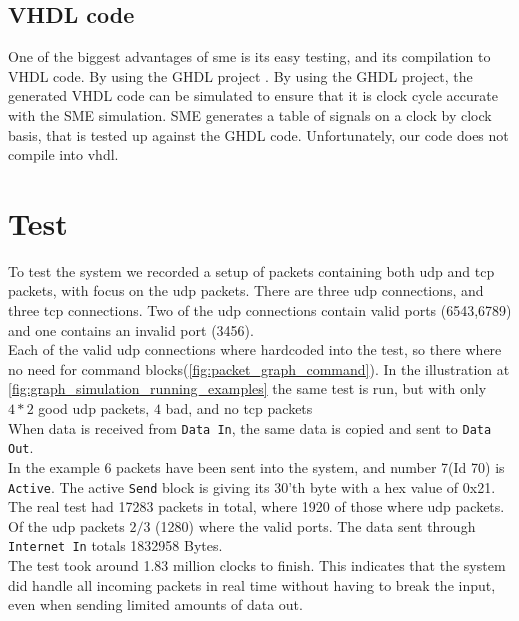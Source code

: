 \subsection{VHDL code}
One of the biggest advantages of \gls{sme} is its easy testing, and its
compilation to VHDL code. By using the GHDL project
\cite{github_ghdl}.
By using the GHDL project, the generated VHDL code can be simulated to ensure
that it is clock cycle accurate with the SME simulation. SME generates a table
of signals on a clock by clock basis, that is tested up against the GHDL code.
Unfortunately, our code does not compile into \gls{vhdl}.


\section{Test}
To test the system we recorded a setup of packets containing both \gls{udp} and
\gls{tcp} packets, with focus on the \gls{udp} packets. There are three
\gls{udp} connections, and three \gls{tcp} connections. Two of the \gls{udp}
connections contain valid ports (6543,6789) and one contains an invalid port (3456).\\
Each of the valid \gls{udp} connections where hardcoded into the test, so there where no
need for command blocks(\autoref{fig:packet_graph_command}).
In the illustration at \autoref{fig:graph_simulation_running_examples} the
same test is run, but with only $4*2$ good \gls{udp} packets, $4$ bad, and
no \gls{tcp} packets\\
When data is received from \texttt{Data In}, the same data is copied and
sent to \texttt{Data Out}. \\
In the example 6 packets have been sent into the system, and number 7(Id 70)
is \texttt{Active}. The active \texttt{Send} block is giving its 30'th byte
with a hex value of 0x21.\\
The real test had 17283 packets in total, where 1920 of those where udp packets.
Of the udp packets $2/3$ (1280) where the valid ports. The data sent
through \texttt{Internet In} totals 1832958 Bytes.\\
The test took around 1.83 million clocks to finish. This indicates that the system
did handle all incoming packets in real time without having to break the input,
even when sending limited amounts of data out.



